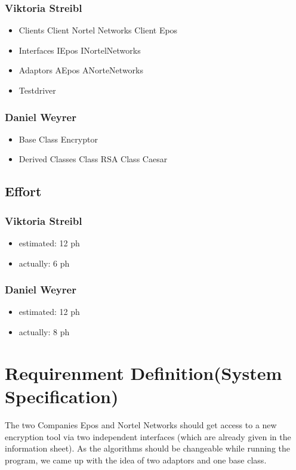 \subsubsection{Viktoria Streibl}
\begin{itemize}
	\item Clients
	\subitem Client Nortel Networks
	\subitem Client Epos

	\item Interfaces
	\subitem IEpos
	\subitem INortelNetworks

	\item Adaptors
	\subitem AEpos
	\subitem ANorteNetworks
		
	\item Testdriver
	
\end{itemize}

\subsubsection{Daniel Weyrer}
\begin{itemize}
	\item Base Class Encryptor
	\item Derived Classes
		\subitem Class RSA
		\subitem Class Caesar
\end{itemize}

\subsection{Effort}

\subsubsection {Viktoria Streibl}
\begin{itemize}
	\item estimated: 12 ph 
	\item actually: 6 ph
\end{itemize}

\subsubsection {Daniel Weyrer}
\begin{itemize}
	\item estimated: 12 ph 
	\item actually: 8 ph
\end{itemize}

\section{Requirenment Definition(System Specification)}
The two Companies Epos and Nortel Networks should get access to a new encryption tool via two independent interfaces (which are already given in the information sheet). As the algorithms should be changeable while running the program, we came up with the idea of two adaptors and one base class.


